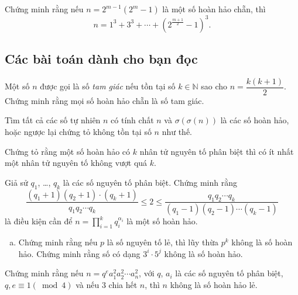 \begin{vd}
	Chứng minh rằng nếu $n=2^{m-1}(2^m-1)$ là một số hoàn hảo chẵn, thì \[n=1^3+3^3+\cdots+\left(2^{\frac{m+1}{2}}-1\right)^3.\]
\end{vd}

\subsection{Các bài toán dành cho bạn đọc}

\begin{bt}
	Một số $n$ được gọi là số \textit{tam giác}  nếu tồn tại số $k\in\mathbb{N}$ sao cho $n=\dfrac{k(k+1)}{2}$. Chứng minh rằng mọi số hoàn hảo chẵn là số tam giác.
\end{bt}

\begin{bt}
	Tìm tất cả các số tự nhiên $n$ có tính chất $n$ và $\sigma(\sigma(n))$ là các số hoàn hảo, hoặc ngược lại chứng tỏ không tồn tại số $n$ như thế.
\end{bt}

\begin{bt}
	Chứng tỏ rằng một số hoàn hảo có $k$ nhân tử nguyên tố phân biệt thì có ít nhất một nhân tử nguyên tố không vượt quá $k$.
\end{bt}

\begin{bt}
	Giả sử $q_1$, \ldots, $q_k$ là các số nguyên tố phân biệt. Chứng minh rằng 
	$$\dfrac{(q_1+1)(q_2+1)\cdot(q_k+1)}{q_1q_2\cdots q_k}\leq 2\leq \dfrac{q_1q_2\cdots q_k}{(q_1-1)(q_2-1)\cdots(q_k-1)}$$
	là điều kiện cần để $n=\prod\limits_{i=1}^kq_i^{\alpha_i}$ là một số hoàn hảo.
\end{bt}

\begin{bt}
	\begin{enumerate}[a)]
		\item Chứng minh rằng nếu $p$ là số nguyên tố lẻ, thì lũy thừa $p^k$ không là số hoàn hảo.
		Chứng minh rằng số có dạng $3^i\cdot 5^j$ không là số hoàn hảo.
	\end{enumerate}
\end{bt}

\begin{bt}
	Chứng minh rằng nếu $n=q^e a_1^2 a_2^2\cdots a_n^2$, với $q$, $a_i$ là các số nguyên tố phân biệt, $q,e\equiv 1(\bmod 4)$ và nếu $3$ chia hết $n$, thì $n$ không là số hoàn hảo lẻ.
\end{bt}

